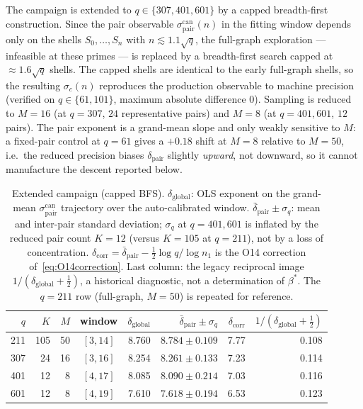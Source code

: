 \documentclass[11pt,a4paper]{article}
\theoremstyle{definition}
\newcommand{\dpair}{\delta_{\mathrm{pair}}}
\newcommand{\dpairmean}{\bar{\delta}_{\mathrm{pair}}}
\newcommand{\bstar}{\beta^{*}}
\newcommand{\sigpair}{\sigma^{\mathrm{can}}_{\mathrm{pair}}}
\begin{document}
      The campaign is extended to $q \in \{307, 401, 601\}$ by a capped breadth-first
      construction.
      Since the pair observable $\sigpair(n)$ in the fitting window depends only on the shells
      $S_0, \ldots, S_n$ with $n \lesssim 1.1\sqrt{q}$, the full-graph exploration --- infeasible
      at these primes --- is replaced by a breadth-first search capped at $\approx 1.6\sqrt{q}$
      shells.
      The capped shells are identical to the early full-graph shells, so the resulting
      $\sigma_c(n)$ reproduces the production observable to machine precision (verified on
      $q \in \{61, 101\}$, maximum absolute difference $0$).
      Sampling is reduced to $M = 16$ (at $q = 307$, $24$ representative pairs) and $M = 8$
      (at $q = 401, 601$, $12$ pairs).
      The pair exponent is a grand-mean slope and only weakly sensitive to $M$: a fixed-pair
      control at $q = 61$ gives a $+0.18$ shift at $M = 8$ relative to $M = 50$, i.e.\ the reduced
      precision biases $\dpair$ slightly \emph{upward}, not downward, so it cannot manufacture the
      descent reported below.

      \begin{table}[h]
        \centering
        \begin{tabular}{rrrcrrrr}
          \toprule
          $q$ & $K$ & $M$ & window & $\delta_{\mathrm{global}}$ & $\dpairmean \pm \sigma_q$
          & $\delta_{\mathrm{corr}}$ & $1/(\delta_{\mathrm{global}} + \tfrac12)$ \\
          \midrule
          211 & 105 & 50 & $[3,14]$ & 8.760 & $8.784 \pm 0.109$ & 7.77 & 0.108 \\
          307 & 24  & 16 & $[3,16]$ & 8.254 & $8.261 \pm 0.133$ & 7.23 & 0.114 \\
          401 & 12  & 8  & $[4,17]$ & 8.085 & $8.090 \pm 0.214$ & 7.03 & 0.116 \\
          601 & 12  & 8  & $[4,19]$ & 7.610 & $7.618 \pm 0.194$ & 6.53 & 0.123 \\
          \bottomrule
        \end{tabular}
        \caption{Extended campaign (capped BFS).
          $\delta_{\mathrm{global}}$: OLS exponent on the grand-mean $\sigpair$ trajectory over the
          auto-calibrated window.
          $\dpairmean \pm \sigma_q$: mean and inter-pair standard deviation; $\sigma_q$ at
          $q = 401, 601$ is inflated by the reduced pair count $K = 12$ (versus $K = 105$ at
          $q = 211$), not by a loss of concentration.
          $\delta_{\mathrm{corr}} = \dpairmean - \tfrac12 \log q / \log n_1$ is the O14 correction
          of~\eqref{eq:O14correction}.
          Last column: the legacy reciprocal image $1/(\delta_{\mathrm{global}} + \tfrac12)$, a
          historical diagnostic, not a determination of $\bstar$.
          The $q = 211$ row (full-graph, $M = 50$) is repeated for reference.}
        \label{tab:extended}
      \end{table}
\end{document}
